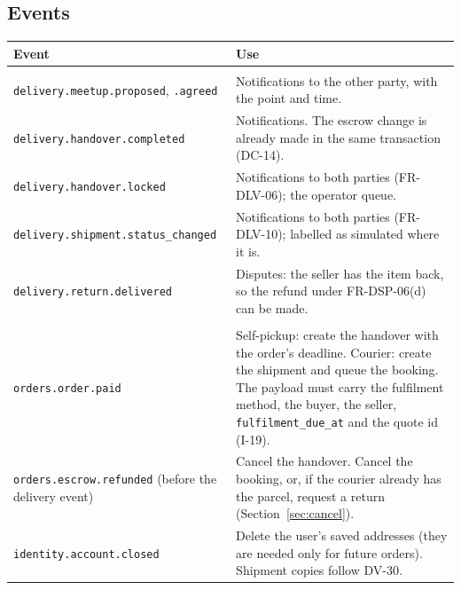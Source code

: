 \documentclass[11pt,a4paper]{article}
\newenvironment{dtable}[1]{\small\begin{longtable}{#1}}{\end{longtable}}
\begin{document}
\subsection{Events}
\begin{dtable}{@{}>{\raggedright\arraybackslash}p{6.0cm}>{\raggedright\arraybackslash}p{9.2cm}@{}}
\toprule
\textbf{Event} & \textbf{Use} \\ \midrule \endhead
\multicolumn{2}{@{}l}{\textit{Published (outbox, DC-6)}} \\
\texttt{delivery.meetup.proposed}, \texttt{.agreed} & Notifications to the other party, with the point and time. \\
\texttt{delivery.handover.completed} & Notifications. The escrow change is already made in the same transaction (DC-14). \\
\texttt{delivery.handover.locked} & Notifications to both parties (FR-DLV-06); the operator queue. \\
\texttt{delivery.shipment.status\_changed} & Notifications to both parties (FR-DLV-10); labelled as simulated where it is. \\
\texttt{delivery.return.delivered} & Disputes: the seller has the item back, so the refund under FR-DSP-06(d) can be made. \\
\multicolumn{2}{@{}l}{\textit{Consumed (idempotent)}} \\
\texttt{orders.order.paid} & Self-pickup: create the handover with the order's deadline. Courier: create the shipment and queue the booking. The payload must carry the fulfilment method, the buyer, the seller, \texttt{fulfilment\_due\_at} and the quote id (I-19). \\
\texttt{orders.escrow.refunded} (before the delivery event) & Cancel the handover. Cancel the booking, or, if the courier already has the parcel, request a return (Section~\ref{sec:cancel}). \\
\texttt{identity.account.closed} & Delete the user's saved addresses (they are needed only for future orders). Shipment copies follow DV-30. \\
\bottomrule
\end{dtable}
\end{document}
